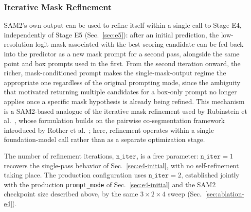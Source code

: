 \subsubsection{Iterative Mask Refinement}
\label{sec:e4-iterative}

SAM2's own output can be used to refine itself within a single call to Stage E4, independently of Stage E5 (Sec.~\ref{sec:e5}): after an initial prediction, the low-resolution logit mask associated with the best-scoring candidate can be fed back into the predictor as a new mask prompt for a second pass, alongside the same point and box prompts used in the first. From the second iteration onward, the richer, mask-conditioned prompt makes the single-mask-output regime the appropriate one regardless of the original prompting mode, since the ambiguity that motivated returning multiple candidates for a box-only prompt no longer applies once a specific mask hypothesis is already being refined. This mechanism is a SAM2-based analogue of the iterative mask refinement used by Rubinstein et al.~\cite{rubinstein2013}, whose formulation builds on the pairwise co-segmentation framework introduced by Rother et al.~\cite{rother2006}; here, refinement operates within a single foundation-model call rather than as a separate optimization stage.

The number of refinement iterations, $\texttt{n\_iter}$, is a free parameter: $\texttt{n\_iter}=1$ recovers the single-pass behavior of Sec.~\ref{sec:e4-initial}, with no self-refinement taking place. The production configuration uses $\texttt{n\_iter}=2$, established jointly with the production \texttt{prompt\_mode} of Sec.~\ref{sec:e4-initial} and the SAM2 checkpoint size described above, by the same $3\times2\times4$ sweep (Sec.~\ref{sec:ablation-e4}).

